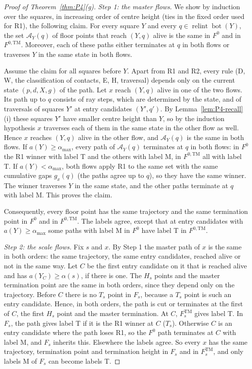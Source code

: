 \documentclass[11pt]{amsart}
\newcommand{\relint}{\operatorname{relint}}
\newcommand{\Bot}{\operatorname{bot}}
\newcommand{\amax}{\alpha_{\max}}
\newcommand{\Fz}{F^{0}}
\newcommand{\Fs}{F_{s}}
\theoremstyle{definition}
\theoremstyle{remark}
\numberwithin{equation}{section}
\begin{document}
\begin{proof}[Proof of Theorem~\ref{thm:P4}(g)]
\emph{Step 1: the master flows.} We show by induction over the squares, in increasing order of centre height (ties in the fixed order used for R1), the following claim. For every square $Y$ and every $q\in\relint\Bot(Y)$, the set $\mathcal A_Y(q)$ of floor points that reach $(Y,q)$ alive is the same in $\Fz$ and in $F^{0,\mathrm{TM}}$. Moreover, each of these paths either terminates at $q$ in both flows or traverses $Y$ in the same state in both flows.

Assume the claim for all squares before $Y$. Apart from R1 and R2, every rule (D, W, the classification of contacts, E, H, traversal) depends only on the current state $(p,d,X,g)$ of the path. Let $x$ reach $(Y,q)$ alive in one of the two flows. Its path up to $q$ consists of ray steps, which are determined by the state, and of traversals of squares $Y'$ at entry candidates $(Y',q')$. By Lemma~\ref{lem:P4-recall}(i) these squares $Y'$ have smaller centre height than $Y$, so by the induction hypothesis $x$ traverses each of them in the same state in the other flow as well. Hence $x$ reaches $(Y,q)$ alive in the other flow, and $\mathcal A_Y(q)$ is the same in both flows. If $a(Y)\ge\amax$, every path of $\mathcal A_Y(q)$ terminates at $q$ in both flows: in $\Fz$ the R1 winner with label T and the others with label M, in $F^{0,\mathrm{TM}}$ all with label T. If $a(Y)<\amax$, both flows apply R1 to the same set with the same cumulative gaps $g_x(q)$ (the paths agree up to $q$), so they have the same winner. The winner traverses $Y$ in the same state, and the other paths terminate at $q$ with label M. This proves the claim.

Consequently, every floor point has the same trajectory and the same termination point in $\Fz$ and in $F^{0,\mathrm{TM}}$. The labels agree, except that at entry candidates with $a(Y)\ge\amax$ some paths with label M in $\Fz$ have label T in $F^{0,\mathrm{TM}}$.

\emph{Step 2: the scale flows.} Fix $s$ and $x$. By Step 1 the master path of $x$ is the same in both orders: the same trajectory, the same entry candidates, reached alive or not in the same way. Let $C$ be the first entry candidate on it that is reached alive and has $a(Y_C)\ge\alpha(s)$, if there is one. The $H_s$ points and the master termination point are the same in both orders, since they depend only on the trajectory. Before $C$ there is no $T_s$ point in $\Fs$, because a $T_s$ point is such an entry candidate. Hence, in both orders, the path is cut or terminates at the first of $C$, the first $H_s$ point and the master termination. At $C$, $F^{\mathrm{TM}}_s$ gives label T. In $\Fs$, the path gives label T if it is the R1 winner at $C$ ($T_s$). Otherwise $C$ is an entry candidate where the path loses R1, so the $\Fz$ path terminates at $C$ with label M, and $\Fs$ inherits this. Elsewhere the labels agree. So every $x$ has the same trajectory, termination point and termination height in $\Fs$ and in $F^{\mathrm{TM}}_s$, and only labels M of $\Fs$ can become labels T.


\end{proof}
\end{document}
